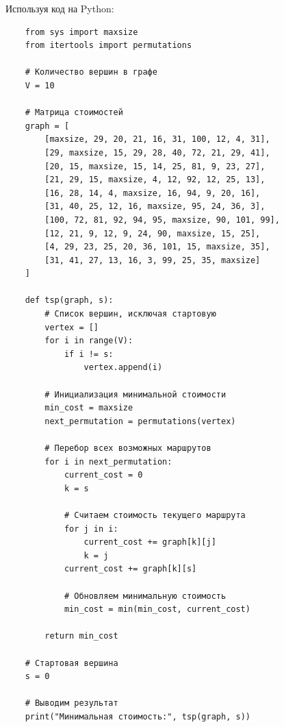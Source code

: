 \documentclass{article}
\begin{document}

Используя код на Python:

\begin{verbatim}
    from sys import maxsize
    from itertools import permutations
    
    # Количество вершин в графе
    V = 10
    
    # Матрица стоимостей
    graph = [
        [maxsize, 29, 20, 21, 16, 31, 100, 12, 4, 31],
        [29, maxsize, 15, 29, 28, 40, 72, 21, 29, 41],
        [20, 15, maxsize, 15, 14, 25, 81, 9, 23, 27],
        [21, 29, 15, maxsize, 4, 12, 92, 12, 25, 13],
        [16, 28, 14, 4, maxsize, 16, 94, 9, 20, 16],
        [31, 40, 25, 12, 16, maxsize, 95, 24, 36, 3],
        [100, 72, 81, 92, 94, 95, maxsize, 90, 101, 99],
        [12, 21, 9, 12, 9, 24, 90, maxsize, 15, 25],
        [4, 29, 23, 25, 20, 36, 101, 15, maxsize, 35],
        [31, 41, 27, 13, 16, 3, 99, 25, 35, maxsize]
    ]
    
    def tsp(graph, s):
        # Список вершин, исключая стартовую
        vertex = []
        for i in range(V):
            if i != s:
                vertex.append(i)
        
        # Инициализация минимальной стоимости
        min_cost = maxsize
        next_permutation = permutations(vertex)
        
        # Перебор всех возможных маршрутов
        for i in next_permutation:
            current_cost = 0
            k = s
            
            # Считаем стоимость текущего маршрута
            for j in i:
                current_cost += graph[k][j]
                k = j
            current_cost += graph[k][s]
            
            # Обновляем минимальную стоимость
            min_cost = min(min_cost, current_cost)
        
        return min_cost
    
    # Стартовая вершина
    s = 0
    
    # Выводим результат
    print("Минимальная стоимость:", tsp(graph, s))
\end{verbatim}
\end{document}

